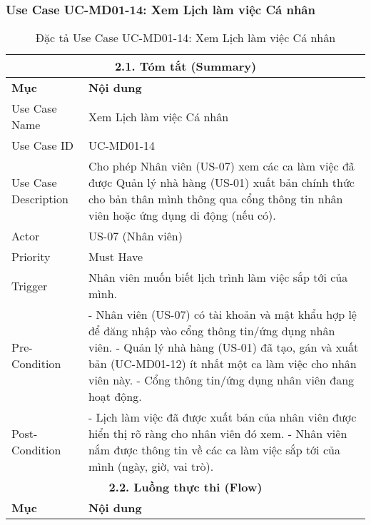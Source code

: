 \subsubsection{Use Case UC-MD01-14: Xem Lịch làm việc Cá nhân}

\begin{longtable}{|m{4cm}|p{11cm}|}
\caption{Đặc tả Use Case UC-MD01-14: Xem Lịch làm việc Cá nhân} \label{tab:uc_md01_14_revised} \\
\hline
\multicolumn{2}{|c|}{\textbf{2.1. Tóm tắt (Summary)}} \\
\hline
\textbf{Mục} & \textbf{Nội dung} \\
\hline
\endhead %
\hline
\endfoot %
\hline
\endlastfoot %
Use Case Name & Xem Lịch làm việc Cá nhân \\
\hline
Use Case ID & UC-MD01-14 \\
\hline
Use Case Description & Cho phép Nhân viên (US-07) xem các ca làm việc đã được Quản lý nhà hàng (US-01) xuất bản chính thức cho bản thân mình thông qua cổng thông tin nhân viên hoặc ứng dụng di động (nếu có). \\
\hline
Actor & US-07 (Nhân viên) \\
\hline
Priority & Must Have \\
\hline
Trigger & Nhân viên muốn biết lịch trình làm việc sắp tới của mình. \\
\hline
Pre-Condition & - Nhân viên (US-07) có tài khoản và mật khẩu hợp lệ để đăng nhập vào cổng thông tin/ứng dụng nhân viên. \newline - Quản lý nhà hàng (US-01) đã tạo, gán và xuất bản (UC-MD01-12) ít nhất một ca làm việc cho nhân viên này. \newline - Cổng thông tin/ứng dụng nhân viên đang hoạt động. \\
\hline
Post-Condition & - Lịch làm việc đã được xuất bản của nhân viên được hiển thị rõ ràng cho nhân viên đó xem. \newline - Nhân viên nắm được thông tin về các ca làm việc sắp tới của mình (ngày, giờ, vai trò). \\
\hline
\multicolumn{2}{|c|}{\textbf{2.2. Luồng thực thi (Flow)}} \\
\hline
\textbf{Mục} & \textbf{Nội dung} \\
\hline

\end{longtable}
